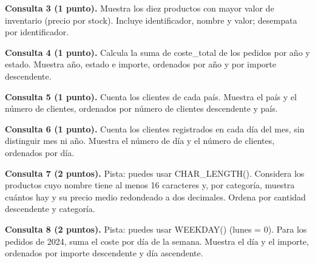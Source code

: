 \documentclass[12pt,a4paper]{article}
\begin{document}
\textbf{Consulta 3 (1 punto).} Muestra los diez productos con mayor valor de inventario (precio por stock). Incluye identificador, nombre y valor; desempata por identificador.\par\vspace{0.65em}
\textbf{Consulta 4 (1 punto).} Calcula la suma de coste\_total de los pedidos por año y estado. Muestra año, estado e importe, ordenados por año y por importe descendente.\par\vspace{0.65em}
\textbf{Consulta 5 (1 punto).} Cuenta los clientes de cada país. Muestra el país y el número de clientes, ordenados por número de clientes descendente y país.\par\vspace{0.65em}
\textbf{Consulta 6 (1 punto).} Cuenta los clientes registrados en cada día del mes, sin distinguir mes ni año. Muestra el número de día y el número de clientes, ordenados por día.\par\vspace{0.65em}
\textbf{Consulta 7 (2 puntos).} Pista: puedes usar CHAR\_LENGTH(). Considera los productos cuyo nombre tiene al menos 16 caracteres y, por categoría, muestra cuántos hay y su precio medio redondeado a dos decimales. Ordena por cantidad descendente y categoría.\par\vspace{0.65em}
\textbf{Consulta 8 (2 puntos).} Pista: puedes usar WEEKDAY() (lunes = 0). Para los pedidos de 2024, suma el coste por día de la semana. Muestra el día y el importe, ordenados por importe descendente y día ascendente.\par\vspace{0.65em}
\end{document}

